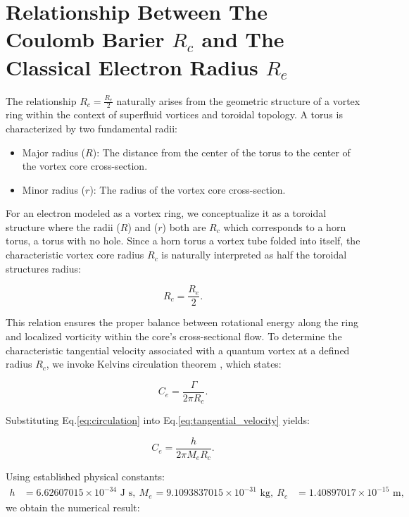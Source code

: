 \section{Relationship Between The Coulomb Barier $R_c$ and The Classical Electron Radius $R_e$ }
The relationship $R_c = \frac{R_e}{2}$ naturally arises from the geometric structure of a vortex ring within the context of superfluid vortices and toroidal topology. A torus is characterized by two fundamental radii:

\begin{itemize}
\item Major radius ($R$): The distance from the center of the torus to the center of the vortex core cross-section.
\item Minor radius ($r$): The radius of the vortex core cross-section.
\end{itemize}

For an electron modeled as a vortex ring, we conceptualize it as a toroidal structure where the radii ($R$) and ($r$) both are $R_c$ which corresponds to a horn torus, a torus with no hole. Since a horn torus a vortex tube folded into itself, the characteristic vortex core radius $R_c$ is naturally interpreted as half the toroidal structure\rqs s radius:

\begin{equation*}
R_c = \frac{R_e}{2}.
\end{equation*}

This relation ensures the proper balance between rotational energy along the ring and localized vorticity within the core's cross-sectional flow. To determine the characteristic tangential velocity associated with a quantum vortex at a defined radius  $ R_c $, we invoke Kelvin\rqs s circulation theorem \cite{donnelly_quantized_1991,tilley_superfluidity_1990}, which states:

\begin{equation*}
    C_e = \frac{\Gamma}{2\pi R_c}.\label{eq:tangential_velocity}
\end{equation*}

Substituting Eq.\eqref{eq:circulation} into Eq.\eqref{eq:tangential_velocity} yields:

\begin{equation*}
    C_e = \frac{h}{2\pi M_e R_c}.
    \label{eq:Ce_vorticity}
\end{equation*}

Using established physical constants:
\begin{align*}
h &= 6.62607015 \times 10^{-34} \text{ J s}, \
M_e &= 9.1093837015 \times 10^{-31} \text{ kg}, \
R_c &= 1.40897017 \times 10^{-15} \text{ m},
\end{align*}
we obtain the numerical result:

